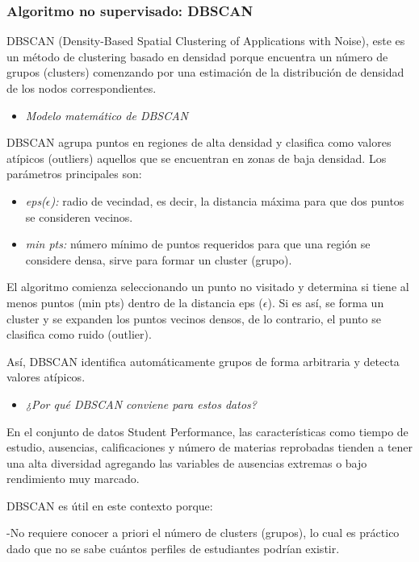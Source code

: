 \documentclass{article}
\begin{document}
\subsubsection*{Algoritmo no supervisado: \textbf{DBSCAN}} 

DBSCAN (Density-Based Spatial Clustering of Applications with Noise), este es un método de clustering basado en densidad porque encuentra un número de grupos (clusters) comenzando por una estimación de la distribución de densidad de los nodos correspondientes.

\begin{itemize}
\item \textit{Modelo matemático de DBSCAN}
\end{itemize}

DBSCAN agrupa puntos en regiones de alta densidad y clasifica como valores atípicos (outliers) aquellos que se encuentran en zonas de baja densidad.  
Los parámetros principales son:
\begin{itemize}[label=\--]
\item \textit{eps($\epsilon$):} radio de vecindad, es decir, la distancia máxima para que dos puntos se consideren vecinos.
\item \textit{min pts:} número mínimo de puntos requeridos para que una región se considere densa, sirve para formar un cluster (grupo).
\end{itemize}

El algoritmo comienza seleccionando un punto no visitado y determina si tiene al menos puntos (min pts) dentro de la distancia eps ($\epsilon$). Si es así, se forma un cluster y se expanden los puntos vecinos densos, de lo contrario, el punto se clasifica como ruido (outlier).  


Así, DBSCAN identifica automáticamente grupos de forma arbitraria y detecta valores atípicos.


\begin{itemize}
    \item \textit{¿Por qué DBSCAN conviene para estos datos?}
\end{itemize}

En el conjunto de datos Student Performance, las características como tiempo de estudio, ausencias, calificaciones y número de materias reprobadas tienden a tener una alta diversidad agregando las variables de ausencias extremas o bajo rendimiento muy marcado.


DBSCAN es útil en este contexto porque: 


-No requiere conocer a priori el número de clusters (grupos), lo cual es práctico dado que no se sabe cuántos perfiles de estudiantes podrían existir.  
\end{document}
